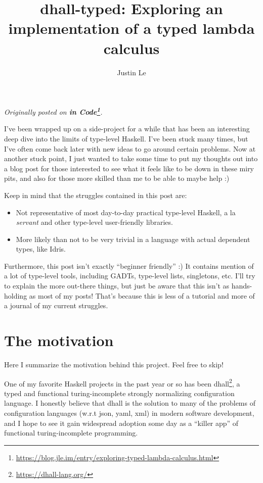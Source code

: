 \documentclass[]{article}
\title{dhall-typed: Exploring an implementation of a typed lambda calculus}
\author{Justin Le}
\renewcommand{\href}[2]{#2\footnote{\url{#1}}}
\begin{document}
\maketitle

\emph{Originally posted on
\textbf{\href{https://blog.jle.im/entry/exploring-typed-lambda-calculus.html}{in
Code}}.}

I've been wrapped up on a side-project for a while that has been an interesting
deep dive into the limits of type-level Haskell. I've been stuck many times, but
I've often come back later with new ideas to go around certain problems. Now at
another stuck point, I just wanted to take some time to put my thoughts out into
a blog post for those interested to see what it feels like to be down in these
miry pits, and also for those more skilled than me to be able to maybe help :)

Keep in mind that the struggles contained in this post are:

\begin{itemize}
\tightlist
\item
  Not representative of most day-to-day practical type-level Haskell, a la
  \emph{servant} and other type-level user-friendly libraries.
\item
  More likely than not to be very trivial in a language with actual dependent
  types, like Idris.
\end{itemize}

Furthermore, this post isn't exactly ``beginner friendly'' :) It contains
mention of a lot of type-level tools, including GADTs, type-level lists,
singletons, etc. I'll try to explain the more out-there things, but just be
aware that this isn't as hands-holding as most of my posts! That's because this
is less of a tutorial and more of a journal of my current struggles.

\hypertarget{the-motivation}{%
\section{The motivation}\label{the-motivation}}

Here I summarize the motivation behind this project. Feel free to skip!

One of my favorite Haskell projects in the past year or so has been
\href{https://dhall-lang.org/}{dhall}, a typed and functional turing-incomplete
strongly normalizing configuration language. I honestly believe that dhall is
the solution to many of the problems of configuration languages (w.r.t json,
yaml, xml) in modern software development, and I hope to see it gain widespread
adoption some day as a ``killer app'' of functional turing-incomplete
programming.
\end{document}
